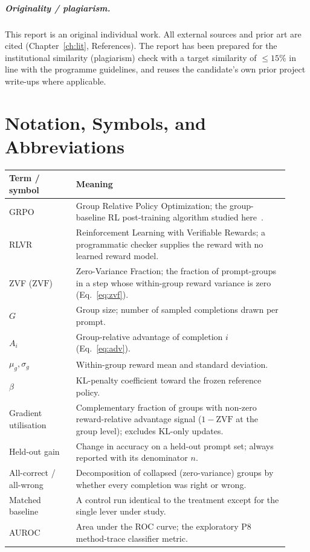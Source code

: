 \documentclass[12pt,a4paper]{report}
\newcommand{\zvf}{\mathrm{ZVF}}
\begin{document}
\paragraph{Originality / plagiarism.} This report is an original individual work. All
external sources and prior art are cited (Chapter~\ref{ch:lit}, References). The report
has been prepared for the institutional similarity (plagiarism) check with a target
similarity of $\le 15\%$ in line with the programme guidelines, and reuses the
candidate's own prior project write-ups where applicable.

\chapter{Notation, Symbols, and Abbreviations}
\label{app:glossary}
\small
\begin{longtable}{@{}L{0.22\linewidth}L{0.70\linewidth}@{}}
\toprule
\textbf{Term / symbol} & \textbf{Meaning} \\
\midrule
\endhead
GRPO & Group Relative Policy Optimization; the group-baseline RL post-training
algorithm studied here~\cite{shao2024deepseekmath}. \\
RLVR & Reinforcement Learning with Verifiable Rewards; a programmatic checker
supplies the reward with no learned reward model. \\
ZVF ($\zvf$) & Zero-Variance Fraction; the fraction of prompt-groups in a step whose
within-group reward variance is zero (Eq.~\eqref{eq:zvf}). \\
$G$ & Group size; number of sampled completions drawn per prompt. \\
$A_i$ & Group-relative advantage of completion $i$ (Eq.~\eqref{eq:adv}). \\
$\mu_g,\sigma_g$ & Within-group reward mean and standard deviation. \\
$\beta$ & KL-penalty coefficient toward the frozen reference policy. \\
Gradient utilisation & Complementary fraction of groups with non-zero reward-relative
advantage signal ($1-\zvf$ at the group level); excludes KL-only updates. \\
Held-out gain & Change in accuracy on a held-out prompt set; always reported with
its denominator $n$. \\
All-correct / all-wrong & Decomposition of collapsed (zero-variance) groups by
whether every completion was right or wrong. \\
Matched baseline & A control run identical to the treatment except for the single
lever under study. \\
AUROC & Area under the ROC curve; the exploratory P8 method-trace classifier metric. \\
\bottomrule
\end{longtable}
\normalsize
\end{document}
